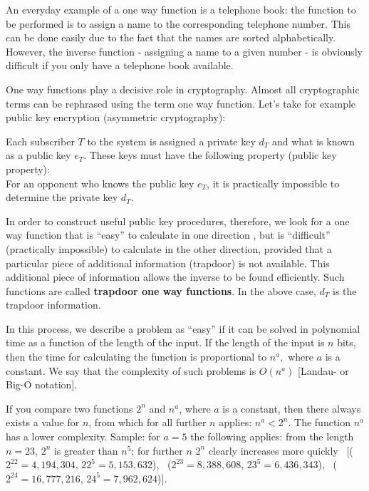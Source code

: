 An everyday example of a one way function is a telephone book: the function to 
be performed is to assign a name to the corresponding telephone number. This can 
be done easily due to the fact that the names are sorted alphabetically. 
However, the inverse function - assigning a name to a given number - is 
obviously difficult if you only have a telephone book available. \par

One way functions play a decisive role in cryptography. Almost all cryptographic 
terms can be rephrased using the term one way function. Let's take for example 
public key encryption  
(asymmetric cryptography):\par

Each subscriber $ T $ to the system is assigned a private  
 key $ d_T $   and what is known as a public key $ e_T $. 
These keys must have the following property (public key property):\\
For an opponent who knows the public key $ e_T $, it is practically impossible 
to determine the private key  $ d_T $.\par

In order to construct useful public key procedures, therefore, we look for a 
one way function that is ``easy'' to calculate in one direction {}, but 
is ``difficult'' (practically impossible) to calculate in the other 
direction, provided that a particular piece of additional information 
 (trapdoor) is not available. This 
additional piece of information allows the inverse to be found efficiently. Such 
functions are called {\bf trapdoor one way functions}. In the above case, $ d_T 
$ is the trapdoor information. \par

In this process, we describe a problem as ``easy'' if it can be solved in 
 polynomial time as a function of the length of the 
input. If the length of the input is $ n $ bits, then the time for calculating 
the function is proportional to $ n^{a}, $ where $ a $  is a constant. We say 
that the  complexity of such problems is $ O(n^{a}) $
[Landau- or Big-O notation]. 

If you compare two functions  $ 2^n $  and   $ n^{a} $,  where $ a $  is a
constant, then there always exists a value for  $ n $,  from which for all
further  $ n $  applies: $ n^{a}  <  2^n $. 
The function  $ n^{a} $  has a lower complexity.    
Sample: for $ a=5 $ the following applies: from the length $ n=23 $, $ 2^n$
is greater than $n^5 $; for further $ n $  $ 2^n $ clearly increases more
quickly \
[($ 2^{22}= 4,194,304 $, $ 22^5= 5,153,632 $), \
 ($ 2^{23}= 8,388,608 $, $ 23^5= 6,436,343 $), \
 ($ 2^{24}=16,777,216 $, $ 24^5= 7,962,624 $)].\par 

